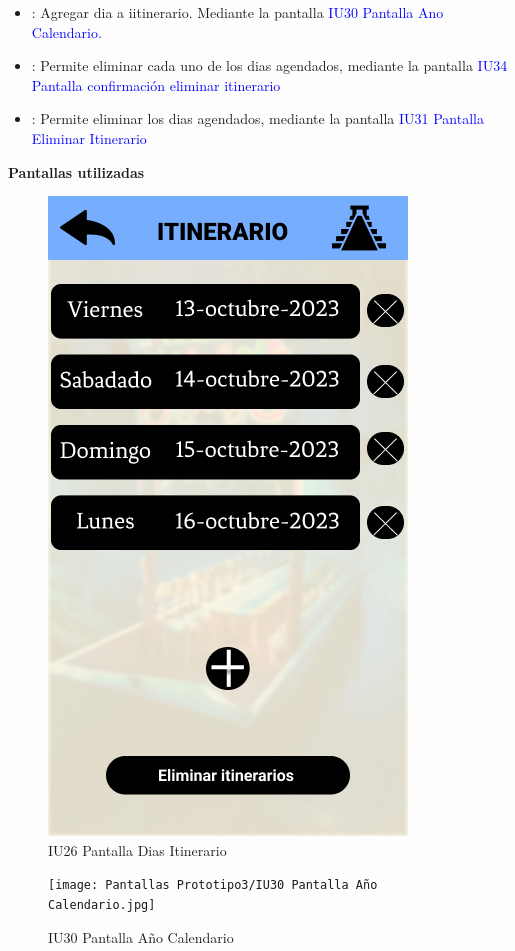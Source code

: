 \begin{itemize}
    \item \fbox{+}: Agregar dia a iitinerario. Mediante la pantalla \textcolor{blue}{ IU30 Pantalla Ano Calendario.}
    
    \item {}: Permite eliminar cada uno de los dias agendados, mediante la pantalla \textcolor{blue}{IU34 Pantalla confirmación eliminar itinerario}
    \item {}: Permite eliminar los dias agendados, mediante la pantalla \textcolor{blue}{ IU31 Pantalla Eliminar Itinerario}
\end{itemize}

\textbf{Pantallas utilizadas}
\begin{figure}[htbp]
    \centering 
        \includegraphics[width=.5\linewidth]{Pantallas Prototipo3/IU26 Pantalla Dias Itinerario.jpg}
        \caption{IU26 Pantalla Dias Itinerario}
        \label{fig:enter-label}
\end{figure}

\begin{figure}[htbp] 
        \centering
        \texttt{[image: Pantallas Prototipo3/IU30 Pantalla Año Calendario.jpg]}
        \caption{IU30 Pantalla Año Calendario}
        \label{fig:enter-label}
\end{figure}

